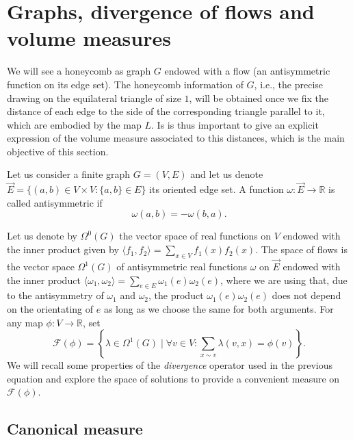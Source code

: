 \documentclass[11pt,a4paper]{amsart}
\numberwithin{equation}{section}
\theoremstyle{definition}
\begin{document}
\section{Graphs, divergence of flows and volume measures}
\label{sec:volume_form_flows}

We will see a honeycomb as graph $G$ endowed
with a flow (an antisymmetric function on its
edge set).  The honeycomb
information of $G$, i.e., the precise
drawing on the equilateral triangle of size $1$, 
will be obtained
once we fix the distance of each
edge to the side of the corresponding triangle parallel to it, which are embodied by the map $L$. Is is thus important to give an explicit expression of the volume measure associated to this distances, which is the main objective of this section.

Let us consider a finite graph $G=(V,E)$
and let us denote $\vec E = \{(a,b) \in V\times V \colon
\{a,b\} \in E\}$
its oriented edge set. 
A function $\omega:\vec{E}\to\mathbb{R}$ is called antisymmetric if 
$$\omega(a,b)=-\omega(b,a).$$

Let us denote by $\Omega^0(G)$ 
the vector space of real functions 
on $V$ endowed with the inner product given by
$\langle f_1, f_2 \rangle = \sum_{x \in V} f_1(x) f_2(x)$.
The space of flows is the vector space
$\Omega^1(G)$ of antisymmetric
real functions $\omega$ on $\vec E$ endowed with the inner product
$\langle \omega_1,\omega_2 \rangle
= \sum_{e \in E} \omega_1(e) \omega_2(e) $,
where we are using that, due to the antisymmetry
of $\omega_1$ and $\omega_2$, the product
$\omega_1(e) \omega_2(e)$ does not depend
on the orientating of $e$
as long as we choose the same for both arguments.
\noindent
For any map $\phi: V\rightarrow \mathbb{R}$, set
\begin{equation}
	\label{eq:DivOfLambda}
	\mathcal{F}(\phi) = 
    \left\{\lambda\in\Omega^1(G) \mid \forall v \in V : \sum_{x \sim v} \lambda (v,x) = \phi(v)\right\}.
\end{equation}
We will recall some properties of 
the \emph{divergence} operator
used in the previous equation
and explore the space of solutions
to provide a convenient measure on $\mathcal{F}(\phi)$.

\subsection{Canonical measure}
\label{subsec:canonical_measure}
\end{document}
